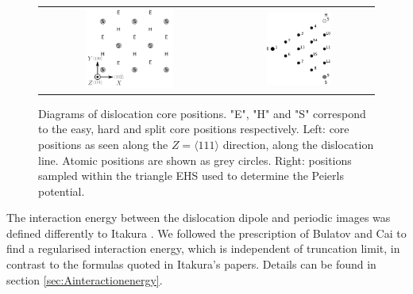 \documentclass[a4paper,11pt]{article}
\numberwithin{equation}{chapter}
\numberwithin{listing}{chapter}
\begin{document}
        \begin{figure}
    \begin{tabular}{cc}
	     \includegraphics[width=0.5\textwidth]{Images/hardeasycoreatomdiagram_coordnew.png} &
             \includegraphics[width=0.45\textwidth]{Images/peierls_potential_positions_tbe.png}  \\
    \end{tabular}
\caption{Diagrams of dislocation core positions. "E", "H" and "S" correspond to the easy, hard and split core positions respectively. Left: core positions as seen along the $Z=\langle 111 \rangle$ direction, along the dislocation line. Atomic positions are shown as grey circles. Right: positions sampled within the triangle EHS used to determine the Peierls potential.  \label{sampledpositions}}
	\label{fig:peierlspot}
    \end{figure}


The interaction energy between the dislocation dipole and periodic images was defined differently
to Itakura \cite{Itakura2012}. We followed the prescription of Bulatov and Cai \cite{vasilybulatov2006} to
find a regularised interaction energy, which is independent of truncation limit, in contrast to
the formulas quoted in Itakura's papers. Details can be found in section \ref{sec:Ainteractionenergy}.
\end{document}
